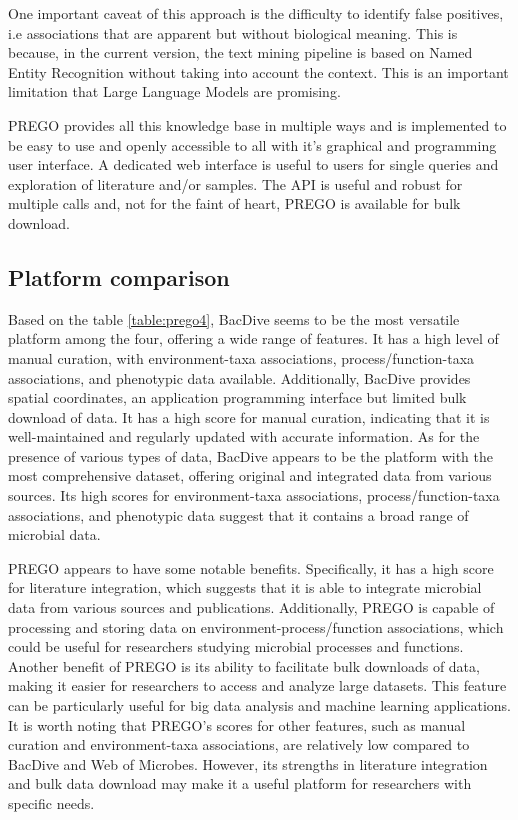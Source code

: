 One important caveat of this approach is the difficulty to 
identify false positives, i.e associations that are apparent but without 
biological meaning. This is because, in the current version, the text mining
pipeline is based on Named Entity Recognition without taking into account 
the context. This is an important limitation that Large Language Models 
are promising.

PREGO provides all this knowledge base in multiple 
ways and is implemented to be easy to use and openly accessible to all with it’s graphical and programming user interface.
A dedicated web interface is useful to users for single queries
and exploration of literature and/or samples. The API is useful and 
robust for multiple calls and, not for the faint of heart, PREGO is 
available for bulk download. 

   \subsection{Platform comparison}
   \label{subsec:prego-similar-platforms}


Based on the table \ref{table:prego4}, BacDive seems to be the most versatile
platform among the four, offering a wide range of features. It has a high level
of manual curation, with environment-taxa associations, process/function-taxa
associations, and phenotypic data available. Additionally, BacDive provides
spatial coordinates, an application programming interface but limited bulk download of data.
It has a high score for manual curation, indicating that it is well-maintained and regularly updated with accurate information.
As for the presence of various types of data, BacDive appears to be the platform
with the most comprehensive dataset, offering original and integrated data from
various sources. Its high scores for environment-taxa associations,
process/function-taxa associations, and phenotypic data suggest that it contains a broad range of microbial data.

PREGO appears to have some notable benefits. Specifically, it has a high score
for literature integration, which suggests that it is able to integrate microbial
data from various sources and publications. Additionally, PREGO is capable of
processing and storing data on environment-process/function associations, which
could be useful for researchers studying microbial processes and functions.
Another benefit of PREGO is its ability to facilitate bulk downloads of data,
making it easier for researchers to access and analyze large datasets.
This feature can be particularly useful for big data analysis and machine learning applications.
It is worth noting that PREGO's scores for other features, such as manual
curation and environment-taxa associations, are relatively low compared to
BacDive and Web of Microbes. However, its strengths in literature integration
and bulk data download may make it a useful platform for researchers with specific needs.



